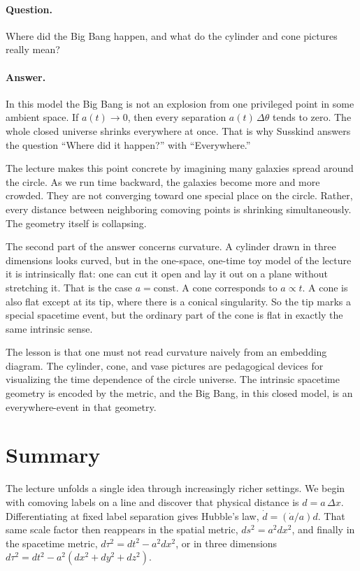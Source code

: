 \paragraph{Question.} Where did the Big Bang happen, and what do the cylinder and cone pictures really mean?

\paragraph{Answer.} In this model the Big Bang is not an explosion from one privileged point in some ambient space. If \(a(t)\to 0\), then every separation \(a(t)\,\Delta\theta\) tends to zero. The whole closed universe shrinks everywhere at once. That is why Susskind answers the question ``Where did it happen?'' with ``Everywhere.''

The lecture makes this point concrete by imagining many galaxies spread around the circle. As we run time backward, the galaxies become more and more crowded. They are not converging toward one special place on the circle. Rather, every distance between neighboring comoving points is shrinking simultaneously. The geometry itself is collapsing.

The second part of the answer concerns curvature. A cylinder drawn in three dimensions looks curved, but in the one-space, one-time toy model of the lecture it is intrinsically flat: one can cut it open and lay it out on a plane without stretching it. That is the case \(a=\text{const}\). A cone corresponds to \(a\propto t\). A cone is also flat except at its tip, where there is a conical singularity. So the tip marks a special spacetime event, but the ordinary part of the cone is flat in exactly the same intrinsic sense.

The lesson is that one must not read curvature naively from an embedding diagram. The cylinder, cone, and vase pictures are pedagogical devices for visualizing the time dependence of the circle universe. The intrinsic spacetime geometry is encoded by the metric, and the Big Bang, in this closed model, is an everywhere-event in that geometry.

\section{Summary}

The lecture unfolds a single idea through increasingly richer settings. We begin with comoving labels on a line and discover that physical distance is \(d=a\,\Delta x\). Differentiating at fixed label separation gives Hubble's law, \(\dot d=(\dot a/a)d\). That same scale factor then reappears in the spatial metric, \(ds^2=a^2dx^2\), and finally in the spacetime metric, \(d\tau^2=dt^2-a^2dx^2\), or in three dimensions \(d\tau^2=dt^2-a^2(dx^2+dy^2+dz^2)\).

